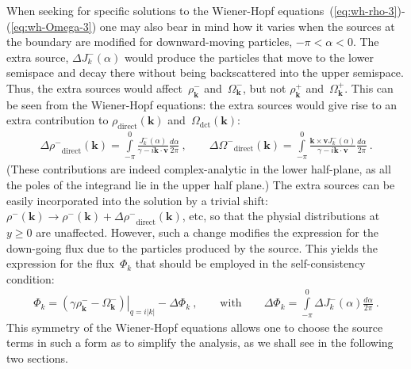 \documentclass[preprint,aps,eqsecnum]{revtex4-1}
\newcommand{\fplus}[1]{{#1}^{+}}
\newcommand{\fminus}[1]{{#1}^{-}}
\newcommand{\dct}[1]{{#1}_\mathrm{direct}}
\begin{document}
When seeking for specific solutions to the Wiener-Hopf
equations~(\ref{eq:wh-rho-3})-(\ref{eq:wh-Omega-3}) one may also
bear in mind how it varies when the sources at the boundary
are modified for downward-moving particles, $-\pi < \alpha < 0$.
The extra source, $\Delta J^{-}_k(\alpha)$ would produce the particles
that move to the lower semispace and decay there without being
backscattered into the upper semispace. Thus, the extra sources
would affect~$\fminus{\rho}_{\bm k}$ and~$\fminus{\Omega}_{\bm k}$,
but not  $\fplus{\rho}_{\bm k}$ and~$\fplus{\Omega}_{\bm k}$.
This can be seen from the Wiener-Hopf equations: the extra sources
would give rise to an extra contribution to $\dct{\rho}({\bm k})$
and~$\Omega_\mathrm{dct}({\bm k})$:
\begin{align}
\Delta \dct{\fminus{\rho}}({\bm k}) =
\int\limits_{-\pi}^{0} \frac{\fminus{J}_k(\alpha)}{\gamma - i {\bm k}\cdot{\bm v}}
\frac{d\alpha}{2\pi}\ ,
\qquad
\Delta \dct{\fminus{\Omega}}({\bm k}) =
\int\limits_{-\pi}^{0} \frac{{\bm k}\times{\bm v}\fminus{J}_k(\alpha)}{
            \gamma - i {\bm k}\cdot{\bm v}}
\frac{d\alpha}{2\pi}\ .
\end{align}
(These contributions are indeed complex-analytic in the lower half-plane,
as all the poles of the integrand lie in the upper half plane.)
The extra sources can be easily incorporated
into the solution by a trivial  shift: $\fminus{\rho}({\bm k})
\to \fminus{\rho}({\bm k}) + \Delta\dct{\fminus{\rho}}({\bm k})$, etc,
so that the physial distributions at $y \geq 0$ are unaffected.
However, such a change modifies the expression for the down-going flux
due to the particles produced by the source. This yields
the expression for the flux~$\Phi_{k}$ that should be employed
in the self-consistency condition:
\begin{align}
  \label{eq:delta-phi}
\Phi_{k} = \left. \left(\gamma \fminus{\rho}_{\bm k}
-  \fminus{\Omega}_{\bm k} \right)\right|_{q = i |k|} - \Delta\Phi_{k}\ ,
\qquad
\mathrm{with}\qquad
\Delta\Phi_{k} = \int\limits_{-\pi}^{0} \Delta \fminus{J}_{k}(\alpha)
\frac{d\alpha}{2\pi}\ .
\end{align}
This symmetry of the Wiener-Hopf equations allows one to choose the
source terms in such a form as to simplify the analysis, as we shall
see in the following two sections.


\end{document}
